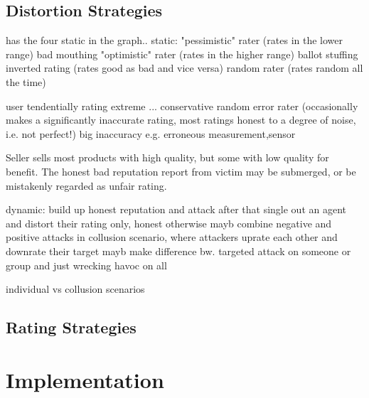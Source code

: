 \documentclass[%
    ]{\PathToTumTemplate/thesis/tum_thesis}
\begin{document}
\section{Distortion Strategies}\label{sec:distort_strategies}

\cite{yu_detecting_2003} has the four static in the graph..
static:
"pessimistic" rater (rates in the lower range) bad mouthing
"optimistic" rater (rates in the higher range) ballot stuffing
inverted rating (rates good as bad and vice versa)
random rater (rates random all the time)

user tendentially rating extreme
... conservative
random error rater (occasionally makes a significantly inaccurate rating, most ratings honest to a degree of noise, i.e. not perfect!)
	big inaccuracy e.g. erroneous measurement,sensor
	
Seller sells most products with high quality, but some with low quality for benefit. The honest bad reputation report from victim may be submerged, or be mistakenly regarded as unfair rating. \cite{ping_xu_rating_2005}

	
	
dynamic:
build up honest reputation and attack after that
single out an agent and distort their rating only, honest otherwise
mayb combine negative and positive attacks in collusion scenario, where attackers uprate each other and downrate their target
mayb make difference bw. targeted attack on someone or group and just wrecking havoc on all

individual vs collusion scenarios



\section{Rating Strategies}\label{sec:approach_rating_strategies}









\chapter{Implementation}\label{chap:implementation}
\end{document}
